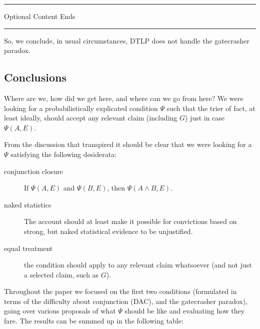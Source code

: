 \documentclass[10pt,dvipsnames,enabledeprecatedfontcommands]{scrartcl}
\newcommand{\et}{\wedge}
\newcommand{\intermezzob}{\nopagebreak 
	\begin{minipage}[c]{13cm}
	\begin{center}\rule{10cm}{0.4pt}

	\tiny{\sc Optional Content Ends}
	
	\vspace{-1mm}
	
	\rule{10cm}{0.4pt}\end{center}
	\end{minipage}
	}
\begin{document}
\intermezzob

So, we conclude, in usual circumstances, DTLP does not handle the
gatecrasher paradox.

\hypertarget{conclusions}{%
\subsection{Conclusions}\label{conclusions}}

Where are we, how did we get here, and where can we go from here? We
were looking for a probabilistically explicated condition \(\Psi\) such
that the trier of fact, at least ideally, should accept any relevant
claim (including \(G\)) just in case \(\Psi(A,E)\).

From the discussion that transpired it should be clear that we were
looking for a \(\Psi\) satisfying the following desiderata:

\begin{description}
\item[conjunction closure] If $\Psi(A,E)$ and $\Psi(B,E)$, then $\Psi(A\et B,E)$.
\item[naked statistics] The account should at least make it possible for convictions based on strong, but naked statistical evidence to be unjustified. 
\item[equal treatment] the condition should apply to any relevant claim whatsoever (and not just a selected claim, such as $G$).
\end{description}

Throughout the paper we focused on the first two conditions (formulated
in terms of the difficulty about conjunction (DAC), and the gatecrasher
paradox), going over various proposals of what \(\Psi\) should be like
and evaluating how they fare. The results can be summed up in the
following table:
\end{document}
